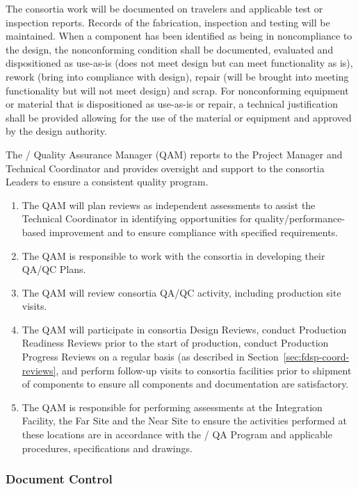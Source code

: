 The consortia work will be documented on travelers and applicable test
or inspection reports. Records of the fabrication, inspection and
testing will be maintained. When a component has been identified as
being in noncompliance to the design, the nonconforming condition
shall be documented, evaluated and dispositioned as use-as-is (does
not meet design but can meet functionality as is), rework (bring into
compliance with design), repair (will be brought into meeting
functionality but will not meet design) and scrap. For nonconforming
equipment or material that is dispositioned as use-as-is or repair, a
technical justification shall be provided allowing for the use of the
material or equipment and approved by the design authority.

The / Quality Assurance Manager (QAM) reports
to the  Project Manager and  Technical
Coordinator and provides oversight and support to the consortia
Leaders to ensure a consistent quality program.
\begin{enumerate}
  \item The QAM will plan reviews as independent assessments to assist
    the  Technical Coordinator in identifying opportunities for
    quality/performance-based improvement and to ensure compliance
    with specified requirements.
  \item The QAM is responsible to work with the consortia in
    developing their QA/QC Plans.
  \item The QAM will review consortia QA/QC activity, including
    production site visits.
  \item The QAM will participate in consortia Design Reviews, conduct
    Production Readiness Reviews prior to the start of production,
    conduct Production Progress Reviews on a regular basis (as
    described in Section~\ref{sec:fdsp-coord-reviews}, and perform
    follow-up visits to consortia facilities prior to shipment of
    components to ensure all components and documentation are
    satisfactory.
\item The QAM is responsible for performing assessments at the
  Integration Facility, the Far Site and the Near Site to
  ensure the activities performed at these locations are in accordance
  with the / QA Program and applicable procedures,
  specifications and drawings.
\end{enumerate}

\subsubsection{Document Control}
\label{sec:fdsp-coord-document}

